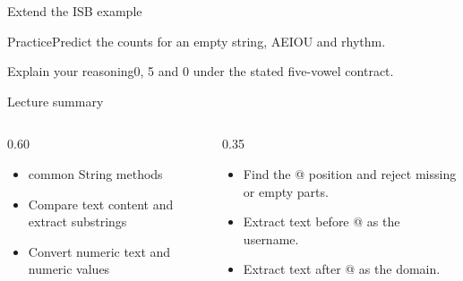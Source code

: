 \documentclass[10pt,aspectratio=169]{beamer}
\begin{document}
\begin{frame}[fragile,t]{Extend the ISB example}
\begin{alertblock}{Practice}Predict the counts for an empty string, AEIOU and rhythm.\end{alertblock}\vspace{3mm}\begin{exampleblock}{Explain your reasoning}0, 5 and 0 under the stated five{-}vowel contract.\end{exampleblock}
\end{frame}
\begin{frame}[fragile,t]{Lecture summary}
\begin{columns}[T,onlytextwidth]\begin{column}{0.60\textwidth}
\begin{itemize}
\item common String methods
\item Compare text content and extract substrings
\item Convert numeric text and numeric values
\end{itemize}
\end{column}\begin{column}{0.35\textwidth}\small
\begin{itemize}
\item Find the @ position and reject missing or empty parts.
\item Extract text before @ as the username.
\item Extract text after @ as the domain.
\end{itemize}
\end{column}\end{columns}
\end{frame}
\end{document}
